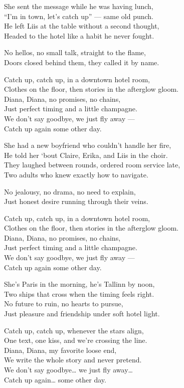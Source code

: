 \begin{lyrics}

She sent the message while he was having lunch,\\
“I’m in town, let’s catch up” — same old punch.\\
He left Liis at the table without a second thought,\\
Headed to the hotel like a habit he never fought.

No hellos, no small talk, straight to the flame,\\
Doors closed behind them, they called it by name.

Catch up, catch up, in a downtown hotel room,\\
Clothes on the floor, then stories in the afterglow gloom.\\
Diana, Diana, no promises, no chains,\\
Just perfect timing and a little champagne.\\
We don’t say goodbye, we just fly away —\\
Catch up again some other day.

She had a new boyfriend who couldn’t handle her fire,\\
He told her ‘bout Claire, Erika, and Liis in the choir.\\
They laughed between rounds, ordered room service late,\\
Two adults who knew exactly how to navigate.

No jealousy, no drama, no need to explain,\\
Just honest desire running through their veins.

Catch up, catch up, in a downtown hotel room,\\
Clothes on the floor, then stories in the afterglow gloom.\\
Diana, Diana, no promises, no chains,\\
Just perfect timing and a little champagne.\\
We don’t say goodbye, we just fly away —\\
Catch up again some other day.

She’s Paris in the morning, he’s Tallinn by noon,\\
Two ships that cross when the timing feels right.\\
No future to ruin, no hearts to pursue,\\
Just pleasure and friendship under soft hotel light.

Catch up, catch up, whenever the stars align,\\
One text, one kiss, and we’re crossing the line.\\
Diana, Diana, my favorite loose end,\\
We write the whole story and never pretend.\\
We don’t say goodbye… we just fly away…\\
Catch up again… some other day.
\end{lyrics}

